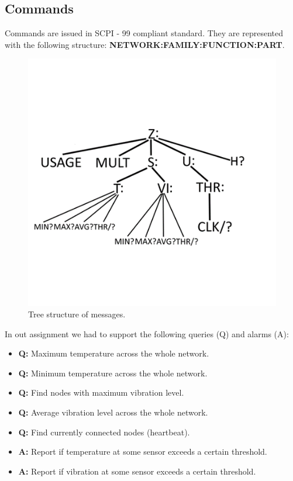 \documentclass[a4paper]{article}
\begin{document}
\subsection{Commands}
Commands are issued in SCPI - 99 compliant standard. They are represented with the following structure: \textbf{NETWORK:FAMILY:FUNCTION:PART}.
\begin{figure}[!htb]
    \begin{center}
        \includegraphics[scale=0.8]{structure.png}
        \caption{Tree structure of messages.} \label{pic1}
    \end{center}
\end{figure}

In out assignment we had to support the following queries (Q) and alarms (A):
\begin{itemize}
\item \textbf{Q:} Maximum temperature across the whole network.
\item \textbf{Q:} Minimum temperature across the whole network.
\item \textbf{Q:} Find nodes with maximum vibration level.
\item \textbf{Q:} Average vibration level across the whole network.
\item \textbf{Q:} Find currently connected nodes (heartbeat).
\item \textbf{A:} Report if temperature at some sensor exceeds a certain threshold.
\item \textbf{A:} Report if vibration at some sensor exceeds a certain threshold.
\end{itemize}
\end{document}
